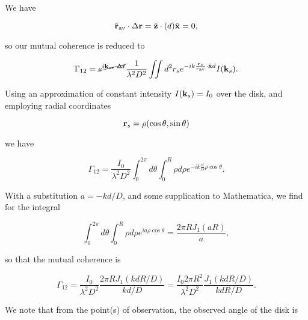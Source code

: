 {

We have

\begin{equation}\label{eqn:modernOptics:ProblemSet2:P3:170}
\hat{\mathbf{r}}_{\text{av}} \cdot \Delta \mathbf{r}
= \hat{\mathbf{z}} \cdot (d) \hat{\mathbf{x}}
= 0,
\end{equation}

so our mutual coherence is reduced to

\begin{equation}\label{eqn:modernOptics:ProblemSet2:P3:190}
\Gamma_{12} 
= 
\cancel{ e^{ i \mathbf{k}_{\text{av}} \cdot \Delta \mathbf{r}} }
\frac{1}{ \lambda^2 D^2 }
\iint d^2 r_s e^{-i k \frac{\mathbf{r}_s}{r_{\text{av}}} \cdot \hat{\mathbf{x}} d } I( \mathbf{k}_s ).
\end{equation}

Using an approximation of constant intensity $I(\mathbf{k}_s) = I_0$ over the disk, and employing radial coordinates

\begin{equation}\label{eqn:modernOptics:ProblemSet2:P3:210}
\mathbf{r}_s = \rho (\cos\theta, \sin\theta)
\end{equation}

we have

\begin{equation}\label{eqn:modernOptics:ProblemSet2:P3:230}
\Gamma_{12} 
= 
\frac{I_0}{ \lambda^2 D^2 }
\int_0^{2 \pi} d\theta 
\int_0^R \rho d\rho
e^{-i k \frac{d}{D} \rho \cos\theta }.
\end{equation}

With a substitution $a = -k d/D$, and some supplication to Mathematica, we find for the integral 

\begin{equation}\label{eqn:modernOptics:ProblemSet2:P3:250}
\int_0^{2 \pi} d\theta 
\int_0^R \rho d\rho
e^{i a \rho \cos\theta }
=
\frac{2 \pi R J_1(a R)}{a},
\end{equation}

so that the mutual coherence is

\begin{equation}\label{eqn:modernOptics:ProblemSet2:P3:270}
\Gamma_{12} 
= 
\frac{I_0}{ \lambda^2 D^2 }
\frac{2 \pi R J_1(k d R/D)}{ k d /D }
= 
\frac{I_0 2 \pi R^2 }{ \lambda^2 D^2 }
\frac{J_1(k d R/D)}{ k d R /D }.
\end{equation}

We note that from the point(s) of observation, the observed angle of the disk is

}
